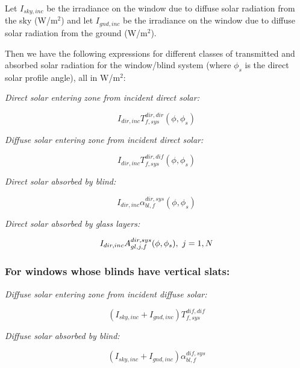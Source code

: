 Let \({I_{sky,inc}}\) be the irradiance on the window due to diffuse solar radiation from the sky (W/m\(^{2}\)) and let \({I_{gnd,inc}}\) be the irradiance on the window due to diffuse solar radiation from the ground (W/m\(^{2}\)).

Then we have the following expressions for different classes of transmitted and absorbed solar radiation for the window/blind system (where \({\phi_s}\) is the direct solar profile angle), all in W/m\(^{2}\):

\emph{Direct solar entering zone from incident direct solar:}

\begin{equation}
{I_{dir,inc}}T_{f,sys}^{dir,dir}(\phi ,{\phi_s})
\end{equation}

\emph{Diffuse solar entering zone from incident direct solar:}

\begin{equation}
{I_{dir,inc}}T_{f,sys}^{dir,dif}(\phi ,{\phi_s})
\end{equation}

\emph{Direct solar absorbed by blind:}

\begin{equation}
{I_{dir,inc}}\alpha_{bl,f}^{dir,sys}(\phi ,{\phi_s})
\end{equation}

\emph{Direct solar absorbed by glass layers:}

\begin{equation}
{I_{dir,inc}}A_{gl,j,f}^{dir,sys}(\phi ,{\phi_s}),{\rm{    }}~j = 1,N
\end{equation}

\subsubsection{For windows whose blinds have vertical slats:}\label{for-windows-whose-blinds-have-vertical-slats}

\emph{Diffuse solar entering zone from incident diffuse solar:}

\begin{equation}
({I_{sky,inc}} + {I_{gnd,inc}})T_{f,sys}^{dif,dif}
\end{equation}

\emph{Diffuse solar absorbed by blind:}

\begin{equation}
({I_{sky,inc}} + {I_{gnd,inc}})\alpha_{bl,f}^{dif,sys}
\end{equation}

